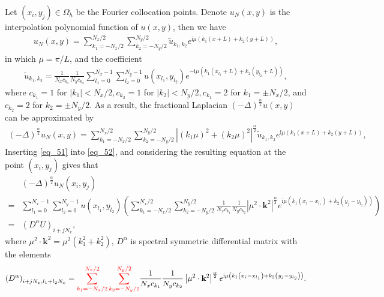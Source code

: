 \documentclass[preprint,compress,3p,10pt,fleqn]{elsarticle}
\numberwithin{equation}{section}
\begin{document}
Let $\left(x_{i}, y_{j}\right) \in \Omega_{h}$ be the Fourier collocation points. Denote $u_{N}(x, y)$ is the
interpolation polynomial function of $u(x, y)$, then we have
\begin{align}\label{eq_50}
u_{N}(x, y)=\sum_{k_{1}=-N_{x} / 2}^{N_{x} / 2} \sum_{k_{2}=-N_{y} / 2}^{N_{y} / 2} \tilde{u}_{k_{1}, k_{2}} e^{\mathrm{i}\mu\left( k_{1} (x+L)+k_{2}(y+L)\right)},
\end{align}
in which $\mu={\pi}/{L}$, and the coefficient
\begin{align}\label{eq_51}
\tilde{u}_{k_{1}, k_{2}}=\frac{1}{N_{x} c_{k_{1}}} \frac{1}{N_{y} c_{k_{2}}} \sum_{l_1=0}^{N_{x}-1} \sum_{l_2=0}^{N_{y}-1} u(x_{l_1}, y_{l_2}) e^{-\mathrm{i}\mu\left( k_{1}(x_{l_1}+L)+k_{2}(y_{l_2}+L)\right)},
\end{align}
where $c_{k_{1}}=1$ for $\left|k_{1}\right|<N_{x} / 2, c_{k_{2}}=1$ for $\left|k_{2}\right|<N_{y} / 2, c_{k_{1}}=2$ for $k_{1}=\pm N_{x} / 2$, and $c_{k_{2}}=2$ for $k_{2}=\pm N_{y} / 2$.
As a result, the fractional Laplacian $(-\Delta)^{\frac{\alpha}{2}} u(x, y)$ can be approximated by
\begin{align}\label{eq_52}
(-\Delta)^{\frac{\alpha}{2}} u_{N}\left(x, y\right)=\sum\limits_{k_{1}=-N_{x} / 2}^{N_{x} / 2} \sum\limits_{k_{2}=-N_{y} / 2}^{N_{y} / 2}\left|\left(k_{1} \mu\right)^{2}+\left(k_{2} \mu\right)^{2}\right|^{\frac{\alpha}{2}} \tilde{u}_{k_{1}, k_{2}} e^{\mathrm{i}\mu\left( k_{1} (x+L)+k_{2}(y+L)\right)},
\end{align}
Inserting \eqref{eq_51} into \eqref{eq_52}, and considering the resulting equation at the point $(x_i,y_j)$ gives that
\begin{align}
&(-\Delta)^{\frac{\alpha}{2}} u_{N}\left(x_{i}, y_{j}\right)\nonumber\\
=&\sum\limits_{l_{1}=0}^{N_{x}-1} \sum\limits_{l_{2}=0}^{N_{y}-1}u(x_{l_{1}}, y_{l_{2}})\left(\sum\limits_{k_{1}=-N_{x} / 2}^{N_{x} / 2} \sum\limits_{k_{2}=-N_{y} / 2}^{N_{y} / 2} \frac{1}{N_{x} c_{k_{1}}} \frac{1}{N_{y} c_{k_{2}}}\left|\mu^{2} \cdot \mathbf{k}^{2}\right|^{\frac{\alpha}{2}} e^{\mathrm{i} \mu\left(k_{1}\left(x_{i}-x_{l_{1}}\right)+k_{2}\left(y_{j}-y_{l_{2}}\right)\right)}\right)\nonumber\\
=&\left(D^{\alpha}U\right)_{i+j N_{x}},\label{eq_53}
\end{align}
where $\mu^{2} \cdot \mathbf{k}^{2}=\mu^{2}\left(k_{1}^{2}+k_{2}^{2}\right)$, $D^{\alpha}$ is spectral symmetric differential matrix with the elements
\begin{align}\label{eq_54}
\left(D^{\alpha}\right)_{i+j N_{x}, l_{1}+l_{2} N_{x}}=\textcolor[rgb]{1.00,0.00,0.00}{\sum\limits_{k_{1}=-N_{x} / 2}^{N_{x} / 2} \sum\limits_{k_{2}=-N_{y} / 2}^{N_{y} / 2}}\frac{1}{N_{x} c_{k_{1}}} \frac{1}{N_{y} c_{k_{2}}}\left|\mu^{2} \cdot \mathbf{k}^{2}\right|^{\frac{\alpha}{2}} e^{\mathrm{i}\mu\left(k_{1}\left(x_{i}-x_{l_{1}}\right)+k_{2}\left(y_{j}-y_{l_{2}}\right)\right)}.
\end{align}
\end{document}
